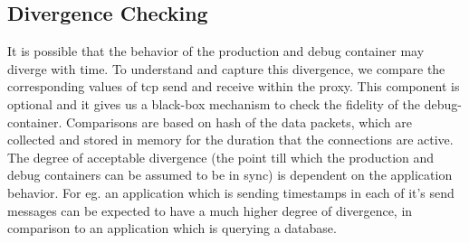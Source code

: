
\subsection{Divergence Checking}
\label{sec:divergenceChecking}

\noindent
It is possible that the behavior of the production and debug container may diverge with time.
To understand and capture this divergence, we compare the corresponding values of tcp send and receive within the proxy.
This component is optional and it gives us a black-box mechanism to check the fidelity of the debug-container.
Comparisons are based on hash of the data packets, which are collected and stored in memory for the duration that the connections are active.
The degree of acceptable divergence (the point till which the production and debug containers can be assumed to be in sync) is dependent on the application behavior. 
For eg. an application which is sending timestamps in each of it's send messages can be expected to have a much higher degree of divergence, in comparison to an application which is querying a database.

